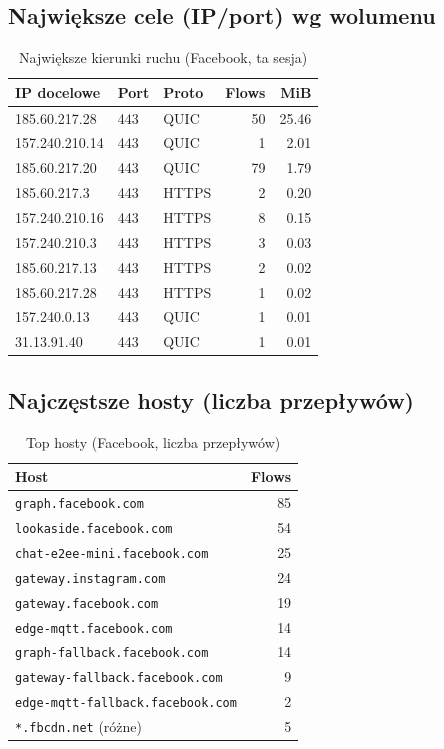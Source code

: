 \subsection{Największe cele (IP/port) wg wolumenu}
\begin{table}[H]
  \centering
  \caption{Największe kierunki ruchu (Facebook, ta sesja)}
  \label{tab:fb-topdst}
  \begin{tabular}{lllrr}
    \toprule
    \textbf{IP docelowe} & \textbf{Port} & \textbf{Proto} & \textbf{Flows} & \textbf{MiB} \\
    \midrule
    185.60.217.28  & 443 & QUIC  & 50 & 25.46 \\
    157.240.210.14 & 443 & QUIC  & 1  & 2.01 \\
    185.60.217.20  & 443 & QUIC  & 79 & 1.79 \\
    185.60.217.3   & 443 & HTTPS & 2  & 0.20 \\
    157.240.210.16 & 443 & HTTPS & 8  & 0.15 \\
    157.240.210.3  & 443 & HTTPS & 3  & 0.03 \\
    185.60.217.13  & 443 & HTTPS & 2  & 0.02 \\
    185.60.217.28  & 443 & HTTPS & 1  & 0.02 \\
    157.240.0.13   & 443 & QUIC  & 1  & 0.01 \\
    31.13.91.40    & 443 & QUIC  & 1  & 0.01 \\
    \bottomrule
  \end{tabular}
\end{table}

\subsection{Najczęstsze hosty (liczba przepływów)}
\begin{table}[H]
  \centering
  \caption{Top hosty (Facebook, liczba przepływów)}
  \label{tab:fb-hosts}
  \begin{tabular}{lr}
    \toprule
    \textbf{Host} & \textbf{Flows} \\
    \midrule
    \texttt{graph.facebook.com} & 85 \\
    \texttt{lookaside.facebook.com} & 54 \\
    \texttt{chat-e2ee-mini.facebook.com} & 25 \\
    \texttt{gateway.instagram.com} & 24 \\
    \texttt{gateway.facebook.com} & 19 \\
    \texttt{edge-mqtt.facebook.com} & 14 \\
    \texttt{graph-fallback.facebook.com} & 14 \\
    \texttt{gateway-fallback.facebook.com} & 9 \\
    \texttt{edge-mqtt-fallback.facebook.com} & 2 \\
    \texttt{*.fbcdn.net} (różne) & 5 \\
    \bottomrule
  \end{tabular}
\end{table}


